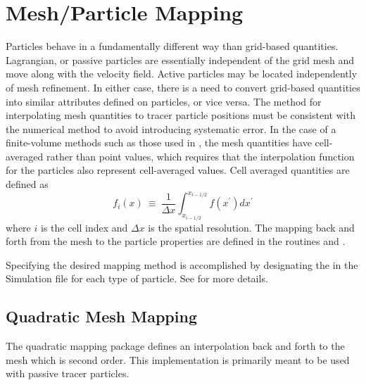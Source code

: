 \section{Mesh/Particle Mapping}
\label{Sec:Particles Mapping}

Particles behave in a fundamentally different way than grid-based quantities.
Lagrangian, or passive particles are essentially independent of the grid mesh and move
along with the velocity field.  Active particles may be located independently of mesh refinement.
In either case, there is a need to convert grid-based quantities into similar attributes defined
on particles, or vice versa.
The method for interpolating mesh quantities to tracer particle positions must
be consistent with the numerical method to avoid introducing systematic
error. In the case of a finite-volume methods such as those used in \flashx, the mesh
quantities have cell-averaged rather than point values, which requires
that the interpolation function for the particles also represent
cell-averaged values. Cell averaged quantities are defined as
\begin{equation}
f_i\left(x\right) \: \equiv \: \frac{1}{\Delta x} \int_{x_{i-1/2}}^{x_{i-1/2}}
f\left(x^\prime \right) dx^\prime
\end{equation}
where $i$ is the cell index and $\Delta x$ is the spatial
resolution.
The mapping back and forth from the mesh to the particle properties
are defined in the routines  and
.

Specifying the desired mapping method is accomplished by designating the 
in the Simulation  file for each type of particle.
See  for more details.



\subsection{Quadratic Mesh Mapping}

The quadratic mapping package defines an interpolation back and forth
to the mesh which is second order. This implementation is primarily
meant to be used with passive tracer particles.

